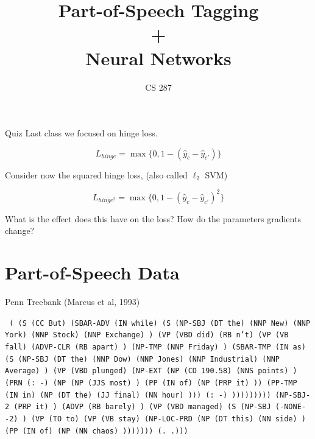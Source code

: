 \documentclass{beamer}
\title{Part-of-Speech Tagging \\ + \\ Neural Networks}
\date{}
\author{CS 287}
\begin{document}
\begin{frame}
  \titlepage
\end{frame}


\begin{frame}{Quiz}
  Last class we focused on hinge loss.

  \[L_{hinge} = \max\{0, 1 - (\hat{y}_c - \hat{y}_{c'}) \} \]

  Consider now the squared hinge loss, (also called $\ell_2$ SVM)

  \[L_{hinge^2} = \max\{0, 1 - (\hat{y}_c - \hat{y}_{c'})^2 \} \]

  What is the effect does this have on the loss?
  How do the parameters gradients change?
\end{frame}



\section{Part-of-Speech Data}

\begin{frame}{Penn Treebank (Marcus et al, 1993)}

\lstset{ basicstyle=\ttfamily, breaklines=true}

\texttt{
( (S (CC But)
    (SBAR-ADV (IN while)
      (S
        (NP-SBJ (DT the) (NNP New) (NNP York) (NNP Stock) (NNP Exchange) )
        (VP (VBD did) (RB n't)
          (VP (VB fall)
            (ADVP-CLR (RB apart) )
            (NP-TMP (NNP Friday) )
            (SBAR-TMP (IN as)
              (S
                (NP-SBJ (DT the) (NNP Dow)
                (NNP Jones) (NNP Industrial) (NNP Average) )
                (VP (VBD plunged)
                  (NP-EXT
                    (NP (CD 190.58) (NNS points) )
                    (PRN (: -)
                      (NP
                        (NP (JJS most) )
                        (PP (IN of)
                          (NP (PRP it) ))
                        (PP-TMP (IN in)
                          (NP (DT the) (JJ final) (NN hour) )))
                      (: -) )))))))))
    (NP-SBJ-2 (PRP it) )
    (ADVP (RB barely) )
    (VP (VBD managed)
      (S
        (NP-SBJ (-NONE- -2) )
        (VP (TO to)
          (VP (VB stay)
            (NP-LOC-PRD
              (NP (DT this) (NN side) )
              (PP (IN of)
                (NP (NN chaos) )))))))
    (. .)))
}
\end{frame}
\end{document}
